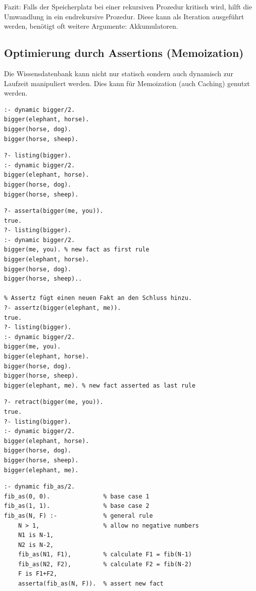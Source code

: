 Fazit: Falls der Speicherplatz bei einer rekursiven Prozedur kritisch wird, hilft die Umwandlung in ein endrekursive Prozedur. Diese kann als Iteration ausgeführt werden, benötigt oft weitere Argumente: Akkumulatoren.

\newpage
\subsection{Optimierung durch Assertions (Memoization)}
Die Wissensdatenbank kann nicht nur statisch sondern auch dynamisch zur Laufzeit manipuliert werden. Dies kann für Memoization (auch Caching) genutzt werden.

\begin{lstlisting}[caption=dynamic/1]
% Damit Prädikate zur Laufzeit modifiziert werden können, müssen diese mit dynamic definiert werden.
:- dynamic bigger/2.
bigger(elephant, horse).
bigger(horse, dog).
bigger(horse, sheep).
\end{lstlisting}

\begin{lstlisting}[caption=listing/1]
% Mittels listing können die Fakten und Regel zu einem Prädikat angezeigt werden.
?- listing(bigger).
:- dynamic bigger/2.
bigger(elephant, horse).
bigger(horse, dog).
bigger(horse, sheep).
\end{lstlisting}

\begin{lstlisting}[caption=asserta/1 \& assertz/1]
% Asserta fügt einen neuen Fakt an den Beginn hinzu.
?- asserta(bigger(me, you)).
true.
?- listing(bigger).
:- dynamic bigger/2.
bigger(me, you). % new fact as first rule
bigger(elephant, horse).
bigger(horse, dog).
bigger(horse, sheep)..

% Assertz fügt einen neuen Fakt an den Schluss hinzu.
?- assertz(bigger(elephant, me)).
true.
?- listing(bigger).
:- dynamic bigger/2.
bigger(me, you).
bigger(elephant, horse).
bigger(horse, dog).
bigger(horse, sheep).
bigger(elephant, me). % new fact asserted as last rule
\end{lstlisting}

\begin{lstlisting}[caption=retract/1]
% Mittels retract können Fakten/Regeln entfernt werden.
?- retract(bigger(me, you)).
true.
?- listing(bigger).
:- dynamic bigger/2.
bigger(elephant, horse).
bigger(horse, dog).
bigger(horse, sheep).
bigger(elephant, me).
\end{lstlisting}

\newpage
\begin{lstlisting}[caption=Naive Fibonnaci optimiert mit Assertions]
% Nach jeder Berechnung einer Fibonacci Zahl wird diese in die Wissensdatenbank an den Anfang (wichtig) gespeichert. Diese müssen nun nicht mehr neu berechnet werden.
:- dynamic fib_as/2.
fib_as(0, 0). 				% base case 1
fib_as(1, 1). 				% base case 2
fib_as(N, F) :- 			% general rule
	N > 1, 					% allow no negative numbers
	N1 is N-1, 
	N2 is N-2,
	fib_as(N1, F1), 		% calculate F1 = fib(N-1)
	fib_as(N2, F2), 		% calculate F2 = fib(N-2)
	F is F1+F2,
	asserta(fib_as(N, F)). 	% assert new fact
\end{lstlisting}

